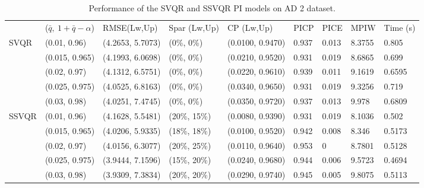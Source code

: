 \documentclass[10pt]{article} %
\begin{document}
\begin{table}[]
{\fontsize{9}{9}\selectfont \begin{tabular}{|l|l|l|l|l|l|l|l|l|}
\cline{1-9}
        & ($\bar{q},~1+\bar{q}-\alpha$)               & RMSE(Lw,Up)   & Spar (Lw,Up)     & CP (Lw,Up)     & PICP  & PICE & MPIW   & Time (s) \\ \cline{1-9} 
\multirow{5}{*}{SVQR} &
        (0.01, 0.96) & (4.2653, 5.7073) & (0\%, 0\%) & (0.0100, 0.9470) & 0.937 & 0.013 & 8.3755 & 0.805 \\ 
        & (0.015, 0.965) & (4.1993, 6.0698) & (0\%, 0\%) & (0.0210, 0.9520) & 0.931 & 0.019 & 8.6865 & 0.699 \\ 
        & (0.02, 0.97) & (4.1312, 6.5751) & (0\%, 0\%) & (0.0220, 0.9610) & 0.939 & 0.011 & 9.1619 & 0.6595 \\
       & (0.025, 0.975) & (4.0525, 6.8163) & (0\%, 0\%) & (0.0340, 0.9650) & 0.931 & 0.019 & 9.3256 & 0.719 \\ 
       & (0.03, 0.98) & (4.0251, 7.4745) & (0\%, 0\%) & (0.0350, 0.9720) & 0.937 & 0.013 & 9.978 & 0.6809 \\ 
        \hline
       \multirow{5}{*}{SSVQR} &  (0.01, 0.96) & (4.1628, 5.5481) & (20\%, 15\%) & (0.0080, 0.9390) & 0.931 & 0.019 & 8.1036 & 0.502 \\ 
         & (0.015, 0.965) & (4.0206, 5.9335) & (18\%, 18\%) & (0.0100, 0.9520) & 0.942 & 0.008 & 8.346 & 0.5173 \\ 
        & (0.02, 0.97) & (4.0156, 6.3077) & (20\%, 25\%) & (0.0110, 0.9640) & 0.953 & 0 & 8.7801 & 0.5128 \\ 
        & (0.025, 0.975) & (3.9444, 7.1596) & (15\%, 20\%) & (0.0240, 0.9680) & 0.944 & 0.006 & 9.5723 & 0.4694 \\ 
        & (0.03, 0.98) & (3.9309, 7.3834) & (20\%, 20\%) & (0.0290, 0.9740) & 0.945 & 0.005 & 9.8075 & 0.5113 \\ \hline
    \end{tabular}}
    \caption{Performance of the SVQR and SSVQR PI models on AD 2 dataset.}
\label{AD2}
\end{table}
\end{document}
